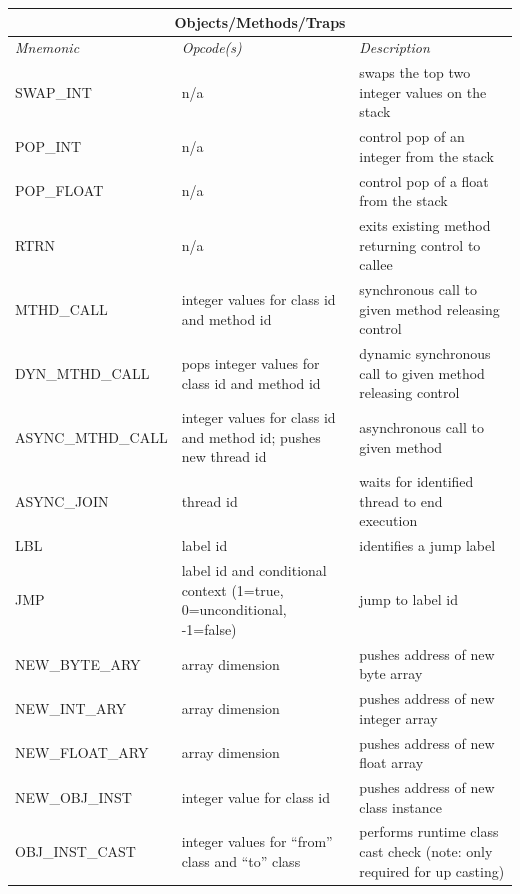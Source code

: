\documentclass[12pt]{article}
\begin{document}
\begin{center}
\vspace{\baselineskip}
\begin{tabular}{| l | p{4 cm} | p{6 cm} |}
\hline
\multicolumn{3}{|c|}{\textbf{Objects/Methods/Traps}} \\
\hline
\emph{Mnemonic}  &  \emph{Opcode(s)}  &  \emph{Description} \\ \hline \hline
SWAP\_INT & n/a & swaps the top two integer values on the stack \\ \hline
POP\_INT & n/a & control pop of an integer from the stack \\ \hline
POP\_FLOAT & n/a & control pop of a float from the stack \\ \hline
RTRN & n/a & exits existing method returning control to callee \\ \hline
MTHD\_CALL & integer values for class id and method id & synchronous call to given method releasing control \\ \hline
DYN\_MTHD\_CALL & pops integer values for class id and method id & dynamic synchronous call to given method releasing control \\ \hline
ASYNC\_MTHD\_CALL & integer values for class id and method id; pushes new thread id & asynchronous call to given method \\ \hline
ASYNC\_JOIN & thread id & waits for identified thread to end execution \\ \hline
LBL & label id & identifies a jump label \\ \hline
JMP & label id and conditional context (1=true, 0=unconditional, -1=false) & jump to label id \\ \hline
NEW\_BYTE\_ARY & array dimension & pushes address of new byte array \\ \hline
NEW\_INT\_ARY & array dimension & pushes address of new integer array \\ \hline
NEW\_FLOAT\_ARY & array dimension & pushes address of new float array \\ \hline
NEW\_OBJ\_INST & integer value for class id & pushes address of new class instance \\ \hline
OBJ\_INST\_CAST & integer values for ``from'' class and ``to'' class & performs runtime class cast check (note: only required for up casting) \\ \hline
\end{tabular}


\end{center}
\end{document}
